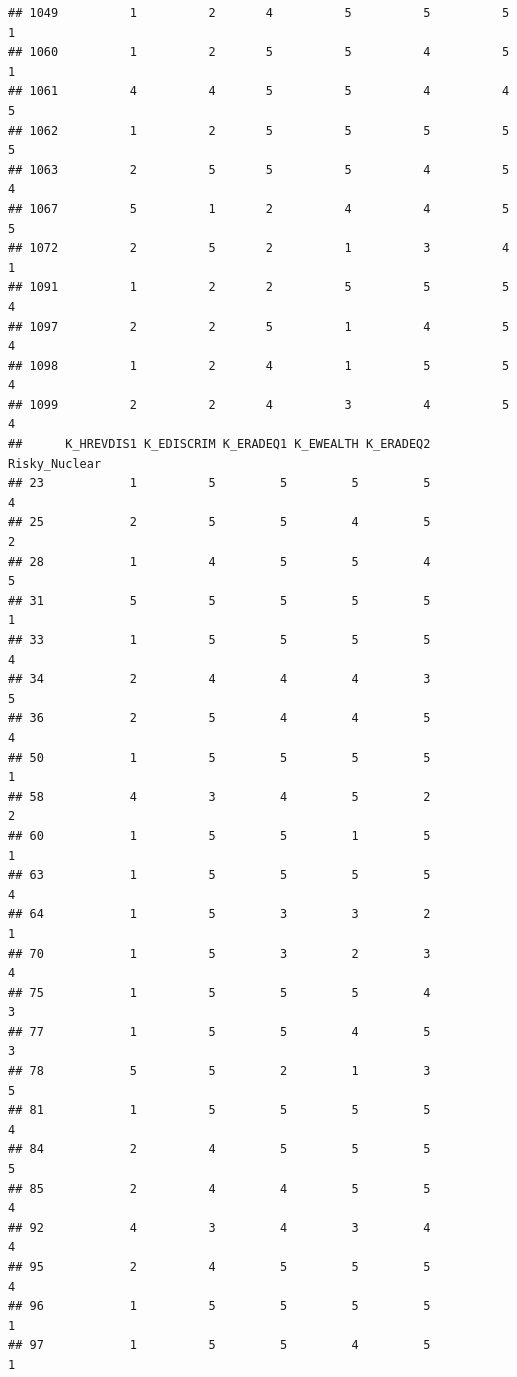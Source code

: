 \documentclass[
]{article}
\begin{document}
\begin{verbatim}
## 1049          1          2       4          5          5          5        1
## 1060          1          2       5          5          4          5        1
## 1061          4          4       5          5          4          4        5
## 1062          1          2       5          5          5          5        5
## 1063          2          5       5          5          4          5        4
## 1067          5          1       2          4          4          5        5
## 1072          2          5       2          1          3          4        1
## 1091          1          2       2          5          5          5        4
## 1097          2          2       5          1          4          5        4
## 1098          1          2       4          1          5          5        4
## 1099          2          2       4          3          4          5        4
##      K_HREVDIS1 K_EDISCRIM K_ERADEQ1 K_EWEALTH K_ERADEQ2 Risky_Nuclear
## 23            1          5         5         5         5             4
## 25            2          5         5         4         5             2
## 28            1          4         5         5         4             5
## 31            5          5         5         5         5             1
## 33            1          5         5         5         5             4
## 34            2          4         4         4         3             5
## 36            2          5         4         4         5             4
## 50            1          5         5         5         5             1
## 58            4          3         4         5         2             2
## 60            1          5         5         1         5             1
## 63            1          5         5         5         5             4
## 64            1          5         3         3         2             1
## 70            1          5         3         2         3             4
## 75            1          5         5         5         4             3
## 77            1          5         5         4         5             3
## 78            5          5         2         1         3             5
## 81            1          5         5         5         5             4
## 84            2          4         5         5         5             5
## 85            2          4         4         5         5             4
## 92            4          3         4         3         4             4
## 95            2          4         5         5         5             4
## 96            1          5         5         5         5             1
## 97            1          5         5         4         5             1

\end{verbatim}
\end{document}
